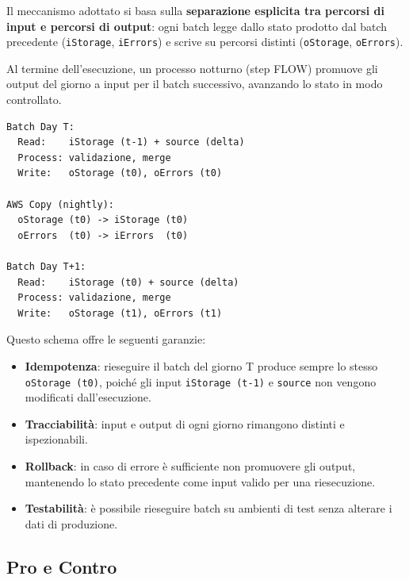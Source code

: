 \documentclass[12pt,a4paper,openright,twoside]{book}
\begin{document}
Il meccanismo adottato si basa sulla \textbf{separazione esplicita tra percorsi di input e percorsi di output}: ogni batch legge dallo stato prodotto dal batch precedente (\texttt{iStorage}, \texttt{iErrors}) e scrive su percorsi distinti (\texttt{oStorage}, \texttt{oErrors}). 

Al termine dell'esecuzione, un processo notturno (step FLOW) promuove gli output del giorno a input per il batch successivo, avanzando lo stato in modo controllato.

\begin{lstlisting}[caption={Ciclo di vita tra batch consecutivi in modalità Delta}, label={lst:ciclo-batch}]
Batch Day T:
  Read:    iStorage (t-1) + source (delta)
  Process: validazione, merge
  Write:   oStorage (t0), oErrors (t0)

AWS Copy (nightly):
  oStorage (t0) -> iStorage (t0)
  oErrors  (t0) -> iErrors  (t0)

Batch Day T+1:
  Read:    iStorage (t0) + source (delta)
  Process: validazione, merge
  Write:   oStorage (t1), oErrors (t1)
\end{lstlisting}

Questo schema offre le seguenti garanzie:
\begin{itemize}
    \item \textbf{Idempotenza}: rieseguire il batch del giorno T produce sempre lo stesso \texttt{oStorage (t0)}, poiché gli input \texttt{iStorage (t-1)} e \texttt{source} non vengono modificati dall'esecuzione.
    \item \textbf{Tracciabilità}: input e output di ogni giorno rimangono distinti e ispezionabili.
    \item \textbf{Rollback}: in caso di errore è sufficiente non promuovere gli output, mantenendo lo stato precedente come input valido per una riesecuzione.
    \item \textbf{Testabilità}: è possibile rieseguire batch su ambienti di test senza alterare i dati di produzione.
\end{itemize}

\subsection{Pro e Contro}
\end{document}
